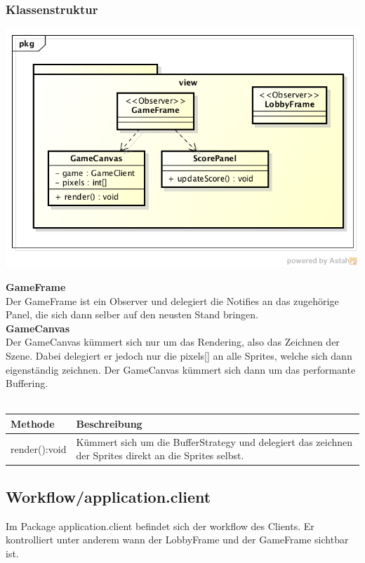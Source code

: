 \documentclass[11pt]{scrartcl}
\begin{document}
\subsubsection{Klassenstruktur}
\includegraphics[scale=0.8]{ClassDiagramView}


\textbf{GameFrame}\\
Der GameFrame ist ein Observer und delegiert die Notifies an das zugehörige Panel, die sich dann selber auf den neusten Stand bringen.\\

\textbf{GameCanvas}\\
Der GameCanvas kümmert sich nur um das Rendering, also das Zeichnen der Szene. Dabei delegiert er jedoch nur die pixels[] an alle Sprites, welche sich dann eigenständig zeichnen. Der GameCanvas kümmert sich dann um das performante Buffering.\\\\
\begin{tabularx}{\linewidth}{l p{12cm}}
\textbf{Methode} & \textbf{Beschreibung}\\
\hline
render():void & Kümmert sich um die BufferStrategy und delegiert das zeichnen der Sprites direkt an die Sprites selbst.
\end{tabularx}

\newpage

\subsection{Workflow/application.client}
Im Package application.client befindet sich der workflow des Clients. Er kontrolliert unter anderem wann der LobbyFrame und der GameFrame sichtbar ist.
\end{document}
